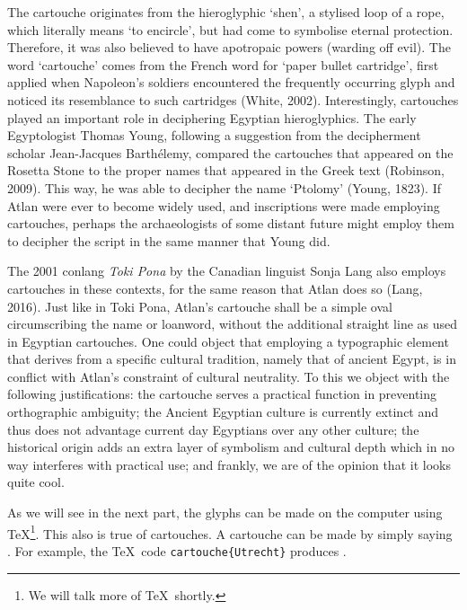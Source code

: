 The cartouche originates from the hieroglyphic ‘shen’, a stylised loop of a rope, which literally means ‘to encircle’, but had come to symbolise eternal protection. Therefore, it was also believed to have apotropaic powers (warding off evil). The word ‘cartouche’ comes from the French word for ‘paper bullet cartridge’, first applied when Napoleon’s soldiers encountered the frequently occurring glyph and noticed its resemblance to such cartridges (White, 2002). Interestingly, cartouches played an important role in deciphering Egyptian hieroglyphics. The early Egyptologist Thomas Young, following a suggestion from the decipherment scholar Jean-Jacques Barthélemy, compared the cartouches that appeared on the Rosetta Stone to the proper names that appeared in the Greek text (Robinson, 2009). This way, he was able to decipher the name ‘Ptolomy’ (Young, 1823). If Atlan were ever to become widely used, and inscriptions were made employing cartouches, perhaps the archaeologists of some distant future might employ them to decipher the script in the same manner that Young did. 

The 2001 conlang {\it Toki Pona} by the Canadian linguist Sonja Lang also employs cartouches in these contexts, for the same reason that Atlan does so (Lang, 2016). Just like in Toki Pona, Atlan’s cartouche shall be a simple oval circumscribing the name or loanword, without the additional straight line as used in Egyptian cartouches. One could object that employing a typographic element that derives from a specific cultural tradition, namely that of ancient Egypt, is in conflict with Atlan’s constraint of cultural neutrality. To this we object with the following justifications: the cartouche serves a practical function in preventing orthographic ambiguity; the Ancient Egyptian culture is currently extinct and thus does not advantage current day Egyptians over any other culture; the historical origin adds an extra layer of symbolism and cultural depth which in no way interferes with practical use; and frankly, we are of the opinion that it looks quite cool. 

As we will see in the next part, the glyphs can be made on the computer using \TeX{}\footnote{We will talk more of \TeX{}\ shortly.}. This also is true of cartouches. A cartouche can be made by simply saying . For example, the \TeX{}\ code  {\tt {}cartouche\{Utrecht\}} produces \footnotemark.

